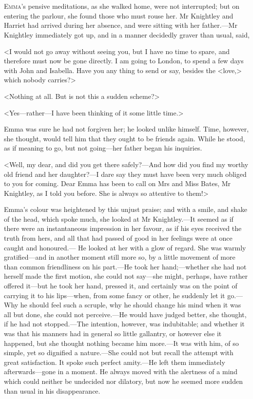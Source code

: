 \chapter[Chapter \thechapter]{}
\lettrine[lraise=0.3]{E}{mma}'s pensive meditations, as she walked home, were not interrupted; but on entering the parlour, she found those who must rouse her. Mr Knightley and Harriet had arrived during her absence, and were sitting with her father.—Mr Knightley immediately got up, and in a manner decidedly graver than usual, said,

<I would not go away without seeing you, but I have no time to spare, and therefore must now be gone directly. I am going to London, to spend a few days with John and Isabella. Have you any thing to send or say, besides the <love,> which nobody carries?>

<Nothing at all. But is not this a sudden scheme?>

<Yes—rather—I have been thinking of it some little time.>

Emma was sure he had not forgiven her; he looked unlike himself. Time, however, she thought, would tell him that they ought to be friends again. While he stood, as if meaning to go, but not going—her father began his inquiries.

<Well, my dear, and did you get there safely?—And how did you find my worthy old friend and her daughter?—I dare say they must have been very much obliged to you for coming. Dear Emma has been to call on Mrs and Miss Bates, Mr Knightley, as I told you before. She is always so attentive to them!>

Emma's colour was heightened by this unjust praise; and with a smile, and shake of the head, which spoke much, she looked at Mr Knightley.—It seemed as if there were an instantaneous impression in her favour, as if his eyes received the truth from hers, and all that had passed of good in her feelings were at once caught and honoured.— He looked at her with a glow of regard. She was warmly gratified—and in another moment still more so, by a little movement of more than common friendliness on his part.—He took her hand;—whether she had not herself made the first motion, she could not say—she might, perhaps, have rather offered it—but he took her hand, pressed it, and certainly was on the point of carrying it to his lips—when, from some fancy or other, he suddenly let it go.—Why he should feel such a scruple, why he should change his mind when it was all but done, she could not perceive.—He would have judged better, she thought, if he had not stopped.—The intention, however, was indubitable; and whether it was that his manners had in general so little gallantry, or however else it happened, but she thought nothing became him more.—It was with him, of so simple, yet so dignified a nature.—She could not but recall the attempt with great satisfaction. It spoke such perfect amity.—He left them immediately afterwards—gone in a moment. He always moved with the alertness of a mind which could neither be undecided nor dilatory, but now he seemed more sudden than usual in his disappearance.

